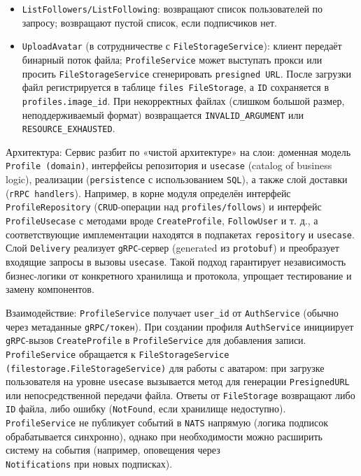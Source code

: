 \begin{itemize}
    \item \texttt{ListFollowers/ListFollowing}: возвращают список пользователей по запросу; возвращают пустой список, если подписчиков нет.
    \item \texttt{UploadAvatar} (в сотрудничестве с \texttt{FileStorageService}): клиент передаёт бинарный поток файла; \texttt{ProfileService} может выступать прокси или просить \texttt{FileStorageService} сгенерировать \texttt{presigned URL}. После загрузки файл регистрируется в таблице \texttt{files FileStorage}, а \texttt{ID} сохраняется в \texttt{profiles.image\_id}. При некорректных файлах (слишком большой размер, неподдерживаемый формат) возвращается \texttt{INVALID\_ARGUMENT} или \texttt{RESOURCE\_EXHAUSTED}.
\end{itemize}
Архитектура: Сервис разбит по «чистой архитектуре» на слои: доменная модель \texttt{Profile (domain)}, интерфейсы репозитория и \texttt{usecase} (catalog of business logic), реализации (\texttt{persistence} с использованием \texttt{SQL}), а также слой доставки (\texttt{гRPC handlers}). Например, в корне модуля определён интерфейс \\ \texttt{ProfileRepository} (\texttt{CRUD}-операции над \texttt{profiles/follows}) и интерфейс \texttt{ProfileUsecase} с методами вроде \texttt{CreateProfile}, \texttt{FollowUser} и т. д., а соответствующие имплементации находятся в подпакетах \texttt{repository} и \texttt{usecase}. Слой \texttt{Delivery} реализует \texttt{gRPC}-сервер (generated из \texttt{protobuf}) и преобразует входящие запросы в вызовы \texttt{usecase}. Такой подход гарантирует независимость бизнес-логики от конкретного хранилища и протокола, упрощает тестирование и замену компонентов.

Взаимодействие: \texttt{ProfileService} получает \texttt{user\_id} от \texttt{AuthService} (обычно через метаданные \texttt{gRPC/токен}). При создании профиля \texttt{AuthService} инициирует \texttt{gRPC}-вызов \texttt{CreateProfile} в \texttt{ProfileService} для добавления записи. \\ \texttt{ProfileService} обращается к \texttt{FileStorageService (filestorage.FileStorageService)} для работы с аватаром: при загрузке пользователя на уровне \texttt{usecase} вызывается метод для генерации \texttt{PresignedURL} или непосредственной передачи файла. Ответы от \texttt{FileStorage} возвращают либо \texttt{ID} файла, либо ошибку (\texttt{NotFound}, если хранилище недоступно). \texttt{ProfileService} не публикует событий в \texttt{NATS} напрямую (логика подписок обрабатывается синхронно), однако при необходимости можно расширить систему на события (например, оповещения через \\ \texttt{Notifications} при новых подписках).

